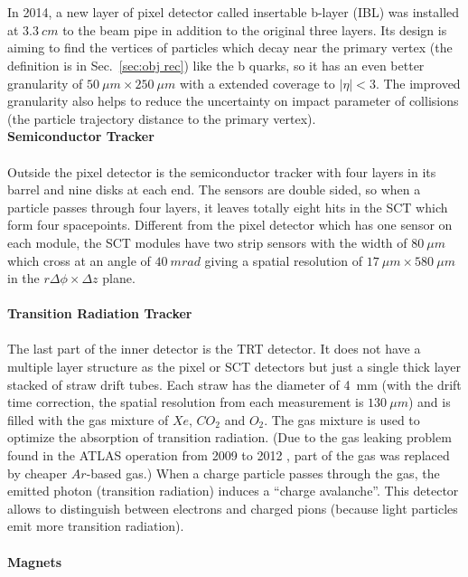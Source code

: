 \\
\\In 2014, a new layer of pixel detector called insertable b-layer (IBL) \cite{Miucci_2014} was installed at $3.3~cm$ to the beam pipe in addition to the original three layers. Its design is aiming to find the vertices of particles which decay near the primary vertex (the definition is in Sec.~\ref{sec:obj rec}) like the b quarks, so it has an even better granularity of $50~\mu m\times 250~\mu m$ with a extended coverage to $|\eta|<3$. The improved granularity also helps to reduce the uncertainty on impact parameter of collisions (the particle trajectory distance to the primary vertex).
\newpage
\noindent
\\{\bf Semiconductor Tracker}
\\
\\Outside the pixel detector is the semiconductor tracker with four layers in its barrel and nine disks at each end. The sensors are double sided, so when a particle passes through four layers, it leaves totally eight hits in the SCT which form four spacepoints. Different from the pixel detector which has one sensor on each module, the SCT modules have two strip sensors with the width of $80~\mu m$ which cross at  an angle of $40~mrad$ giving a spatial resolution of $17~\mu m \times 580~\mu m$ in the $r\Delta \phi \times \Delta z$ plane. 
\\
\\{\bf Transition Radiation Tracker}
\\
\\The last part of the inner detector is the TRT detector. It does not have a multiple layer structure as the pixel or SCT detectors but just a single thick layer stacked of straw drift tubes. Each straw has the diameter of 4~mm (with the drift time correction, the spatial resolution from each measurement is $130~\mu m$) and is filled with the gas mixture of $Xe$, $CO_{2}$ and $O_{2}$. The gas mixture is used to optimize the absorption of transition radiation. (Due to the gas leaking problem found in the ATLAS operation from 2009 to 2012 \cite{Mindur:2139567}, part of the gas was replaced by cheaper $Ar$-based gas.) When a charge particle passes through the gas, the emitted photon (transition radiation) induces a ``charge avalanche''. This detector allows to distinguish between electrons and charged pions (because light particles emit more transition radiation).
\\
\\{\bf Magnets}
\\
